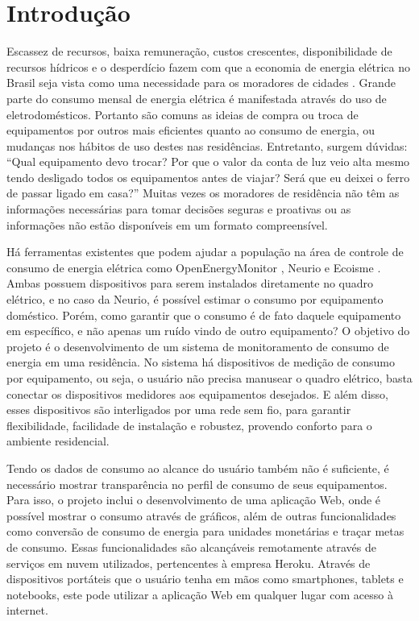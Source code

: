 \chapter{Introdução}
\label{Cap:Introducao}

Escassez de recursos, baixa remuneração, custos crescentes, disponibilidade de recursos hídricos e o desperdício fazem com que a economia de energia elétrica no Brasil seja vista como uma necessidade para os moradores de cidades \cite{eflul}. Grande parte do consumo mensal de energia elétrica é manifestada através do uso de eletrodomésticos. Portanto são comuns as ideias de compra ou troca de equipamentos por outros mais eficientes quanto ao consumo de energia, ou mudanças nos hábitos de uso destes nas residências. Entretanto, surgem dúvidas: ``Qual equipamento devo trocar? Por que o valor da conta de luz veio alta mesmo tendo desligado todos os equipamentos antes de viajar? Será que eu deixei o ferro de passar ligado em casa?'' Muitas vezes os moradores de residência não têm as informações necessárias para tomar decisões seguras e proativas ou as informações não estão disponíveis em um formato compreensível. 

Há ferramentas existentes que podem ajudar a população na área de controle de consumo de energia elétrica como OpenEnergyMonitor \cite{open_energy_monitor}, Neurio \cite{neurio_site} e Ecoisme \cite{ecoisme_site}. Ambas possuem dispositivos para serem instalados diretamente no quadro elétrico, e no caso da Neurio, é possível estimar o consumo por equipamento doméstico. Porém, como garantir que o consumo é de fato daquele equipamento em específico, e não apenas um ruído vindo de outro equipamento? O objetivo do projeto é o desenvolvimento de um sistema de monitoramento de consumo de energia em uma residência. No sistema há dispositivos de medição de consumo por equipamento, ou seja, o usuário não precisa manusear o quadro elétrico, basta conectar os dispositivos medidores aos equipamentos desejados. E além disso, esses dispositivos são interligados por uma rede sem fio, para garantir flexibilidade, facilidade de instalação e robustez, provendo conforto para o ambiente residencial.

Tendo os dados de consumo ao alcance do usuário também não é suficiente, é necessário mostrar transparência no perfil de consumo de seus equipamentos. Para isso, o projeto inclui o desenvolvimento de uma aplicação Web, onde é possível mostrar o consumo através de gráficos, além de outras funcionalidades como conversão de consumo de energia para unidades monetárias e traçar metas de consumo. Essas funcionalidades são alcançáveis remotamente através de serviços em nuvem utilizados, pertencentes à empresa Heroku. Através de dispositivos portáteis que o usuário tenha em mãos como smartphones, tablets e notebooks, este pode utilizar a aplicação Web em qualquer lugar com acesso à internet. 

